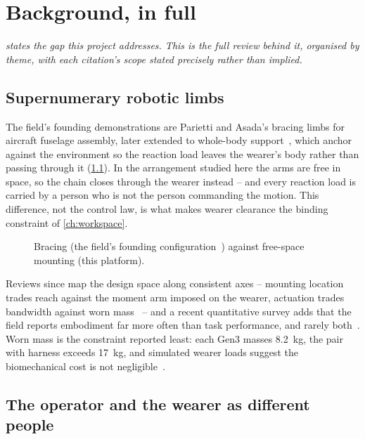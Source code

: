 \chapter{Background, in full}
\label{app:background}

\noindent\emph{ states the gap this project addresses.
This is the full review behind it, organised by theme, with each citation's
scope stated precisely rather than implied.}

\section{Supernumerary robotic limbs}

The field's founding demonstrations are Parietti and Asada's bracing limbs
for aircraft fuselage assembly, later extended to whole-body
support~\cite{parietti2016support}, which anchor against the environment so
the reaction load leaves the wearer's body rather than passing through it
(\cref{fig:bracing}). In the arrangement studied here the arms are free in
space, so the chain closes through the wearer instead -- and every reaction
load is carried by a person who is not the person commanding the motion.
This difference, not the control law, is what makes wearer clearance the
binding constraint of \cref{ch:workspace}.

\begin{figure}[htbp]
  \centering
  
  \caption[Two load paths for a supernumerary limb]{Bracing (the field's
  founding configuration~\cite{parietti2014bracing}) against free-space
  mounting (this platform).}
  \label{fig:bracing}
\end{figure}

Reviews since map the design space along consistent axes -- mounting
location trades reach against the moment arm imposed on the wearer,
actuation trades bandwidth against worn
mass~\cite{yang2021srlreview,prattichizzo2021augmentation,tong2021srlreview,zhang2023srlreview}
-- and a recent quantitative survey adds that the field reports embodiment
far more often than task performance, and rarely
both~\cite{zheng2026quantitative}. Worn mass is the constraint reported
least: each Gen3 masses \SI{8.2}{\kilo\gram}, the pair with harness exceeds
\SI{17}{\kilo\gram}, and simulated wearer loads suggest the biomechanical
cost is not negligible~\cite{moon2024impact}.

\section{The operator and the wearer as different people}

